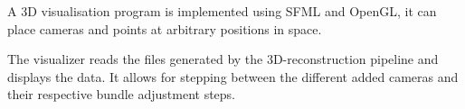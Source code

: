 A 3D visualisation program is implemented using SFML and OpenGL, it can place cameras and points at arbitrary positions in space.

The visualizer reads the files generated by the 3D-reconstruction pipeline and displays the data. It allows for stepping between the different
added cameras and their respective bundle adjustment steps.

